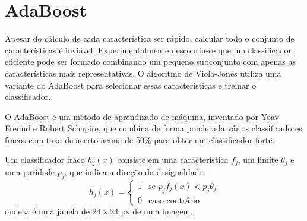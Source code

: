 \section{AdaBoost}\label{sec:adaboost}

Apesar do cálculo de cada característica ser rápido, calcular todo o conjunto de características é inviável. Experimentalmente descobriu-se que um classificador eficiente pode ser formado combinando um pequeno subconjunto com apenas as características mais representativas. O algoritmo de Viola-Jones utiliza uma variante do AdaBoost para selecionar essas características e treinar o classificador.

O AdaBoost é um método de aprendizado de máquina, inventado por Yoav Freund e Robert Schapire\cite{freund1997decision}, que combina de forma ponderada vários classificadores fracos com taxa de acerto acima de 50\% para obter um classificador forte.

Um classificador fraco $h_{j}(x)$ consiste em uma característica $f_{j}$, um limite $\theta_{j}$ e uma paridade $p_{j}$, que indica a direção da desigualdade:
%
\begin{equation} \label{eq:weak_classifier}
    h_{j}(x) = 
    \begin{cases}
        1 & \text{se } p_{j}f_{j}(x) < p_{j}\theta_{j}\\
        0 & \text{caso contrário}
    \end{cases}
\end{equation}
%
onde $x$ é uma janela de $24\times24$ px de uma imagem.


